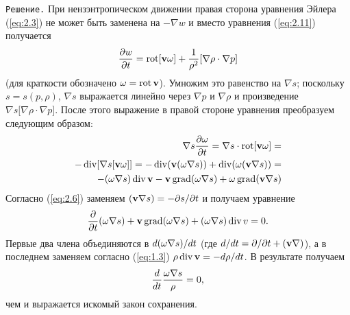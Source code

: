 \texttt{Решение.} При нензэнтропическом движении правая сторона уравнения Эйлера
(\ref{eq:2.3}) не может быть заменена на $- \nabla w$ и вместо уравнения (\ref{eq:2.11})
получается
\[
   \pd{w}{t} = \rot \lbrack \vv \vo \rbrack + \frac1{\rho^2}
   \lbrack \nabla \rho \cdot \nabla p \rbrack
\]
(для краткости обозначено $\vo = \rot \vv$). Умножим это равенство на
$\nabla s$; поскольку $s = s(p,\rho)$, $\nabla s$ выражается линейно через
$\nabla p$ и $\nabla \rho$ и произведение
$\nabla s \lbrack \nabla \rho \cdot \nabla p \rbrack$. После этого выражение
в правой стороне уравнения преобразуем следующим образом:
\begin{eqnarray*}
   \nabla s \pd{\vo}{t} =
   \nabla s \cdot \rot \lbrack \vv \vo \rbrack = \\
   - \Div \lbrack \nabla s \lbrack \vv \vo \rbrack \rbrack =
   - \Div (\vv (\vo \nabla s)) + \Div (\vo (\vv \nabla s)) = \\
   - (\vo \nabla s) \Div \vv - \vv \grad (\vo \nabla s) + \vo \grad (\vv \nabla s)
\end{eqnarray*}
Согласно (\ref{eq:2.6}) заменяем $(\vv \nabla s) = - \partial s/\partial t$ и получаем
уравнение
\[
   \pdt (\vo \nabla s) +\vv \grad (\vo \nabla s) + (\vo \nabla s) \Div v = 0.
\]
Первые два члена объединяются в $d(\vo \nabla s)/dt$ (где
$d/dt = \partial/\partial t + (\vv \nabla)$), а в последнем заменяем согласно
(\ref{eq:1.3}) $\rho \Div \vv = - d \rho / dt$. В результате получаем
\[
   \frac{d}{dt} \frac{\vo \nabla s}{\rho} = 0,
\]
чем и выражается искомый закон сохранения.

